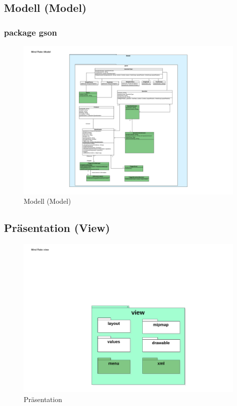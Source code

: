 \documentclass[a4paper]{scrreprt}
\begin{document}
            \subsection{Modell (Model)}

                \subsubsection{package gson}
                    \begin{figure}[H]
                        \centering
                        \includegraphics[scale = 0.9]{Model.pdf}
                        \caption{Modell (Model)}
                    \end{figure}

            \subsection{Präsentation (View)}                    
                
                \begin{figure}[H]
                        \centering
                        \includegraphics[scale = 1.0]{View.pdf}
                        \caption{Präsentation}
                \end{figure}
\end{document}
